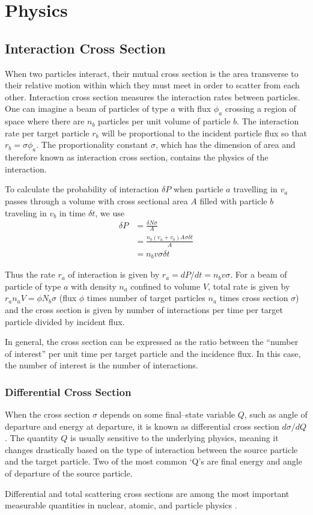 \chapter{Physics}\label{sec:physics}
\section{Interaction Cross Section}
When two particles interact, their mutual cross section is the area transverse to their relative motion within which they must meet in order to scatter from each other. Interaction cross section measures the interaction rates between particles. One can imagine a beam of particles of type $a$ with flux $\phi_a$ crossing a region of space where there are $n_b$ particles per unit volume of particle $b$. The interaction rate per target particle $r_b$ will be proportional to the incident particle flux so that $r_b=\sigma\phi_a$. The proportionality constant $\sigma$, which has the dimension of area and therefore known as interaction cross section, contains the physics of the interaction.

To calculate the probability of interaction $\delta P$ when particle $a$ travelling in $v_a$ passes through a volume with cross sectional area $A$ filled with particle $b$ traveling in $v_b$ in time $\delta t$, we use
\begin{align*}
    \delta P
    &= \frac{\delta N \sigma}{A} \\
    &= \frac{n_b(v_a+v_b)A\sigma \delta t}{A} \\
    &= n_bv\sigma\delta t
\end{align*}

Thus the rate $r_a$ of interaction is given by $r_a = dP/dt=n_b v\sigma$. For a beam of particle of type $a$ with density $n_a$ confined to volume $V$, total rate is given by $r_a n_a V=\phi N_b\sigma$ (flux $\phi$ times number of target particles $n_a$ times cross section $\sigma$) and the cross section is given by number of interactions per time per target particle divided by incident flux.

In general, the cross section can be expressed as the ratio between the ``number of interest'' per unit time per target particle and the incidence flux. In this case, the number of interest is the number of interactions.

\subsection{Differential Cross Section}
When the cross section $\sigma$ depends on some final--state variable $Q$, such as angle of departure and energy at departure, it is known as differential cross section $d\sigma /dQ$. The quantity $Q$ is usually sensitive to the underlying physics, meaning it changes drastically based on the type of interaction between the source particle and the target particle. Two of the most common `Q's are final energy and angle of departure of the source particle.

Differential and total scattering cross sections are among the most important measurable quantities in nuclear, atomic, and particle physics \cite{dcs}.

